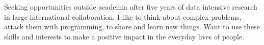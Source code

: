 

\begin{cvparagraph}

Seeking opportunities outside academia after five years of data intensive research in large international collaboration. 
I like to think about complex problems, attack them with programming, to share and learn new things. 
Want to use these skills and interests to make a positive impact in the everyday lives of people. 


\end{cvparagraph}
